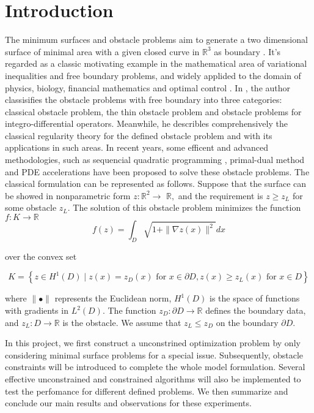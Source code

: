 \section{Introduction}
The minimum surfaces and obstacle problems aim to generate a two dimensional surface of minimal area with a given closed curve in $\mathbb R^{3}$ as boundary \cite{dolan2004benchmarking}. It's regarded as a classic motivating example in the mathematical area of variational inequalities and free boundary problems, and widely applided to the domain of physics, biology, financial mathematics and optimal control \cite{zosso2017efficient,ros2018obstacle,caffarelli1998obstacle}. In \cite{ros2018obstacle}, the author classisifies the obstacle problems with free boundary into three categories: classical obstacle problem, the thin obstacle problem and obstacle problems for integro-differential operators. Meanwhile, he describles comprehensively the classical regularity theory for the defined obstacle problem and with its applications in such areas. In recent years, some efficent and advanced methodologies, such as sequencial quadratic programming \cite{liu2009solution}, primal-dual method \cite{zosso2017efficient} and PDE accelerations \cite{calder2019pde} have been proposed to solve these obstacle problems. The classical formulation can be represented as follows. Suppose that the surface can be showed in nonparametric form $z:\mathbb R^{2} \rightarrow$ $\mathbb R,$ and the requirement is $z \geq z_{L}$ for some obstacle $z_{L} .$ The solution of this obstacle problem minimizes the function $f: K \rightarrow \mathbb R$
\begin{equation}
    f(z)=\int_{D} \sqrt{1+\|\nabla z(x)\|^{2}} d x
\end{equation}

over the convex set

\begin{equation}
K=\left\{z \in H^{1}(D) \mid z(x)=z_{D}(x) \text { for } x \in \partial D, z(x) \geq z_{L}(x) \text { for } x \in D\right\}
\end{equation}

where $\|\bullet\|$ represents the Euclidean norm, $H^{1}(D)$ is the space of functions with gradients in $L^{2}(D) .$ The function $z_{D}: \partial D \rightarrow \mathbb R$ defines the boundary data, and $z_{L}:D \rightarrow \mathbb R$ is the obstacle. We assume that $z_{L} \leq z_{D}$ on the boundary $\partial D$.

In this project, we first construct a unconstrined optimization problem by only considering minimal surface problems for a special issue. Subsequently, obstacle constraints will be introduced to complete the whole model formulation. Several effective unconstrained and constrained algorithms will also be implemented to test the perfomance for different defined problems. We then summarize and conclude our main results and observations for these experiments. 


